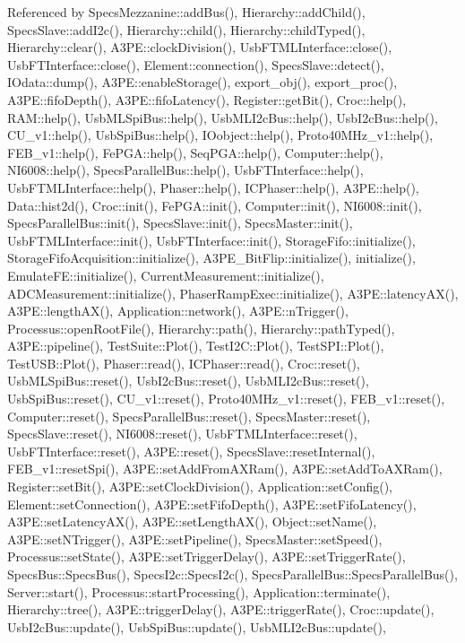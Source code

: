 Referenced by Specs\+Mezzanine\+::add\+Bus(), Hierarchy\+::add\+Child(), Specs\+Slave\+::add\+I2c(), Hierarchy\+::child(), Hierarchy\+::child\+Typed(), Hierarchy\+::clear(), A3\+P\+E\+::clock\+Division(), Usb\+F\+T\+M\+L\+Interface\+::close(), Usb\+F\+T\+Interface\+::close(), Element\+::connection(), Specs\+Slave\+::detect(), I\+Odata\+::dump(), A3\+P\+E\+::enable\+Storage(), export\+\_\+obj(), export\+\_\+proc(), A3\+P\+E\+::fifo\+Depth(), A3\+P\+E\+::fifo\+Latency(), Register\+::get\+Bit(), Croc\+::help(), R\+A\+M\+::help(), Usb\+M\+L\+Spi\+Bus\+::help(), Usb\+M\+L\+I2c\+Bus\+::help(), Usb\+I2c\+Bus\+::help(), C\+U\+\_\+v1\+::help(), Usb\+Spi\+Bus\+::help(), I\+Oobject\+::help(), Proto40\+M\+Hz\+\_\+v1\+::help(), F\+E\+B\+\_\+v1\+::help(), Fe\+P\+G\+A\+::help(), Seq\+P\+G\+A\+::help(), Computer\+::help(), N\+I6008\+::help(), Specs\+Parallel\+Bus\+::help(), Usb\+F\+T\+Interface\+::help(), Usb\+F\+T\+M\+L\+Interface\+::help(), Phaser\+::help(), I\+C\+Phaser\+::help(), A3\+P\+E\+::help(), Data\+::hist2d(), Croc\+::init(), Fe\+P\+G\+A\+::init(), Computer\+::init(), N\+I6008\+::init(), Specs\+Parallel\+Bus\+::init(), Specs\+Slave\+::init(), Specs\+Master\+::init(), Usb\+F\+T\+M\+L\+Interface\+::init(), Usb\+F\+T\+Interface\+::init(), Storage\+Fifo\+::initialize(), Storage\+Fifo\+Acquisition\+::initialize(), A3\+P\+E\+\_\+\+Bit\+Flip\+::initialize(), initialize(), Emulate\+F\+E\+::initialize(), Current\+Measurement\+::initialize(), A\+D\+C\+Measurement\+::initialize(), Phaser\+Ramp\+Exec\+::initialize(), A3\+P\+E\+::latency\+A\+X(), A3\+P\+E\+::length\+A\+X(), Application\+::network(), A3\+P\+E\+::n\+Trigger(), Processus\+::open\+Root\+File(), Hierarchy\+::path(), Hierarchy\+::path\+Typed(), A3\+P\+E\+::pipeline(), Test\+Suite\+::\+Plot(), Test\+I2\+C\+::\+Plot(), Test\+S\+P\+I\+::\+Plot(), Test\+U\+S\+B\+::\+Plot(), Phaser\+::read(), I\+C\+Phaser\+::read(), Croc\+::reset(), Usb\+M\+L\+Spi\+Bus\+::reset(), Usb\+I2c\+Bus\+::reset(), Usb\+M\+L\+I2c\+Bus\+::reset(), Usb\+Spi\+Bus\+::reset(), C\+U\+\_\+v1\+::reset(), Proto40\+M\+Hz\+\_\+v1\+::reset(), F\+E\+B\+\_\+v1\+::reset(), Computer\+::reset(), Specs\+Parallel\+Bus\+::reset(), Specs\+Master\+::reset(), Specs\+Slave\+::reset(), N\+I6008\+::reset(), Usb\+F\+T\+M\+L\+Interface\+::reset(), Usb\+F\+T\+Interface\+::reset(), A3\+P\+E\+::reset(), Specs\+Slave\+::reset\+Internal(), F\+E\+B\+\_\+v1\+::reset\+Spi(), A3\+P\+E\+::set\+Add\+From\+A\+X\+Ram(), A3\+P\+E\+::set\+Add\+To\+A\+X\+Ram(), Register\+::set\+Bit(), A3\+P\+E\+::set\+Clock\+Division(), Application\+::set\+Config(), Element\+::set\+Connection(), A3\+P\+E\+::set\+Fifo\+Depth(), A3\+P\+E\+::set\+Fifo\+Latency(), A3\+P\+E\+::set\+Latency\+A\+X(), A3\+P\+E\+::set\+Length\+A\+X(), Object\+::set\+Name(), A3\+P\+E\+::set\+N\+Trigger(), A3\+P\+E\+::set\+Pipeline(), Specs\+Master\+::set\+Speed(), Processus\+::set\+State(), A3\+P\+E\+::set\+Trigger\+Delay(), A3\+P\+E\+::set\+Trigger\+Rate(), Specs\+Bus\+::\+Specs\+Bus(), Specs\+I2c\+::\+Specs\+I2c(), Specs\+Parallel\+Bus\+::\+Specs\+Parallel\+Bus(), Server\+::start(), Processus\+::start\+Processing(), Application\+::terminate(), Hierarchy\+::tree(), A3\+P\+E\+::trigger\+Delay(), A3\+P\+E\+::trigger\+Rate(), Croc\+::update(), Usb\+I2c\+Bus\+::update(), Usb\+Spi\+Bus\+::update(), Usb\+M\+L\+I2c\+Bus\+::update(), 